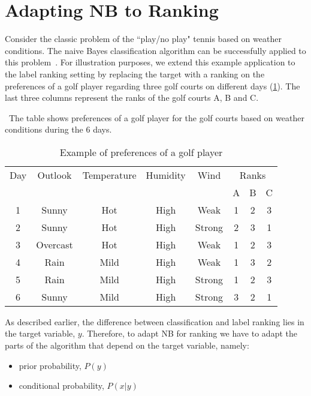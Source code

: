 \documentclass[12pt, a4paper]{article}\usepackage[]{graphicx}\usepackage[]{color}
\begin{document}
\section{Adapting NB to Ranking}
\label{ch2-sec:adapting}
Consider the classic problem of the ``play/no play" tennis based on  weather conditions. The naive Bayes classification algorithm can be successfully applied to this problem~\citep[chap. 6]{mitchell1997}. For illustration purposes, we extend this example application to the label ranking setting by replacing the target with a ranking on the preferences of a golf player regarding three golf courts on different days (\ref{ch2-tab01}). The last three columns represent the ranks of the golf courts A, B and C.

\begin{table}
\caption{Example of preferences of a golf player}
\ The table shows preferences of a golf player for the golf courts based on weather conditions during the 6 days. 
\begin{center}
\begin{tabular}{cccccccc}
\toprule
Day&Outlook&Temperature&Humidity&Wind&\multicolumn{3}{c}{Ranks}\\
\cline{6-8}
&&&&&A&B&C\\
\midrule
 1 & Sunny & Hot & High & Weak &   1 &   2 &   3 \\ 
  2 & Sunny & Hot & High & Strong &   2 &   3 &   1 \\ 
  3 & Overcast & Hot & High & Weak &   1 &   2 &   3 \\ 
  4 & Rain & Mild & High & Weak &   1 &   3 &   2 \\ 
  5 & Rain & Mild & High & Strong &   1 &   2 &   3 \\ 
  6 & Sunny & Mild & High & Strong &   3 &   2 &   1 \\ 
  
\bottomrule
\end{tabular}
\end{center}
\label{ch2-tab01}
\end{table}

As described earlier, the difference between classification and label ranking lies in the target variable, $y$. Therefore, to adapt NB for ranking we have to adapt the parts of the algorithm that depend on the target variable, namely:
\begin{itemize}
\item prior probability, $P(y)$
\item conditional probability, $P(x|y)$
\end{itemize}
\end{document}
